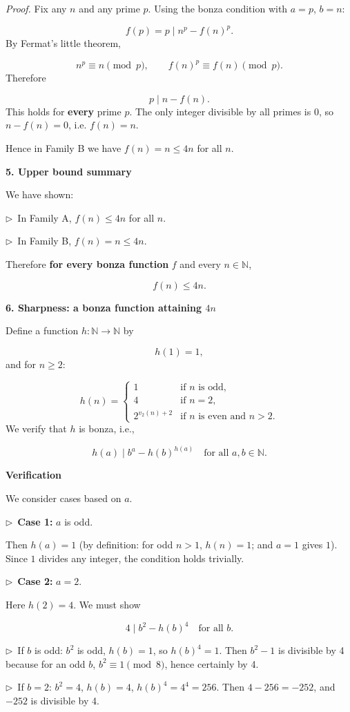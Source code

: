\documentclass{llmxive}
\providecommand{\solutionheading}[1]{\par\smallskip\noindent\textbf{#1}\par}
\providecommand{\compactbullet}[1]{\par\noindent$\triangleright$~#1\par}
\begin{document}
\emph{Proof.} Fix any \(n\) and any prime \(p\). Using the bonza condition with \(a=p\), \(b=n\):\par
\[
f(p)=p \mid n^{p} - f(n)^{p}.
\]
By Fermat's little theorem,\par
\[
n^{p}\equiv n\pmod p,\qquad f(n)^{p}\equiv f(n)\pmod p.
\]
Therefore\par
\[
p\mid n - f(n).
\]
This holds for \textbf{every} prime \(p\). The only integer divisible by all primes is 0, so \(n-f(n)=0\), i.e. \(f(n)=n\).\par
Hence in Family B we have \(f(n)=n\le 4n\) for all \(n\).\par
\smallskip
\solutionheading{5. Upper bound summary}
We have shown:\par
\compactbullet{In Family A, \(f(n)\le 4n\) for all \(n\).}
\compactbullet{In Family B, \(f(n)=n\le 4n\).}
Therefore \textbf{for every bonza function }\(f\) and every \(n\in\mathbb N\),\textbf{}\par
\[
\boxed{f(n)\le 4n}.
\]
\smallskip
\solutionheading{6. Sharpness: a bonza function attaining \(4n\)}
Define a function \(h:\mathbb N\to\mathbb N\) by\par
\[
h(1)=1,
\]
and for \(n\ge 2\):\par
\[
h(n)=\begin{cases}
1 & \text{if } n \text{ is odd},\\[2pt]
4 & \text{if } n=2,\\[2pt]
2^{v_{2}(n)+2} & \text{if } n \text{ is even and } n>2.
\end{cases}
\]
We verify that \(h\) is bonza, i.e.,\par
\[
h(a)\mid b^{a} - h(b)^{h(a)}\quad\text{for all } a,b\in\mathbb N.
\]
\smallskip
\solutionheading{Verification}
We consider cases based on \(a\).\par
\compactbullet{\textbf{Case 1: }\(a\) is odd.\textbf{}}
Then \(h(a)=1\) (by definition: for odd \(n>1\), \(h(n)=1\); and \(a=1\) gives \(1\)). Since \(1\) divides any integer, the condition holds trivially.\par
\compactbullet{\textbf{Case 2: }\(a=2\).\textbf{}}
Here \(h(2)=4\). We must show\par
\[
  4\mid b^{2} - h(b)^{4}\quad\text{for all } b.
  \]
\compactbullet{If \(b\) is odd: \(b^{2}\) is odd, \(h(b)=1\), so \(h(b)^{4}=1\). Then \(b^{2}-1\) is divisible by 4 because for an odd \(b\), \(b^{2}\equiv1\pmod8\), hence certainly by 4.}
\compactbullet{If \(b=2\): \(b^{2}=4\), \(h(b)=4\), \(h(b)^{4}=4^{4}=256\). Then \(4-256=-252\), and \(-252\) is divisible by 4.}
\end{document}
